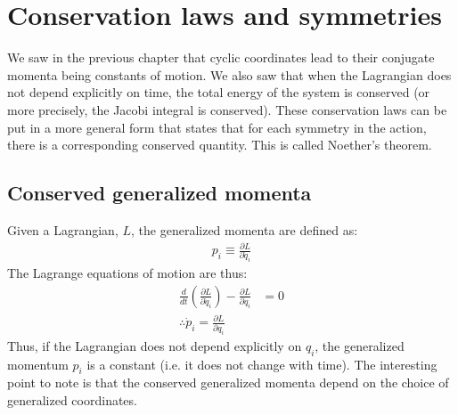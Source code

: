 %
\chapter{Conservation laws and symmetries}
\label{chap:ConsLaws}
We saw in the previous chapter that cyclic coordinates lead to their conjugate momenta being constants of motion. We also saw that when the Lagrangian does not depend explicitly on time, the total energy of the system is conserved (or more precisely, the Jacobi integral is conserved). These conservation laws can be put in a more general form that states that for each symmetry in the action, there is a corresponding conserved quantity. This is called Noether's theorem.

\section{Conserved generalized momenta}
Given a Lagrangian, $L$, the generalized momenta are defined as:
\begin{align}
p_i\equiv\frac{\partial L}{\partial \dot{q}_i}
\end{align}
The Lagrange equations of motion are thus:
\begin{align}
\frac{d}{dt}\left(\frac{\partial L}{\partial \dot{q}_i}\right)-\frac{\partial L}{\partial q_i}&=0\nonumber\\
\therefore \dot{p}_i=\frac{\partial L}{\partial q_i}
\end{align}
Thus, if the Lagrangian does not depend explicitly on $q_i$, the generalized momentum $p_i$ is a constant (i.e. it does not change with time). The interesting point to note is that the conserved generalized momenta depend on the choice of generalized coordinates.

